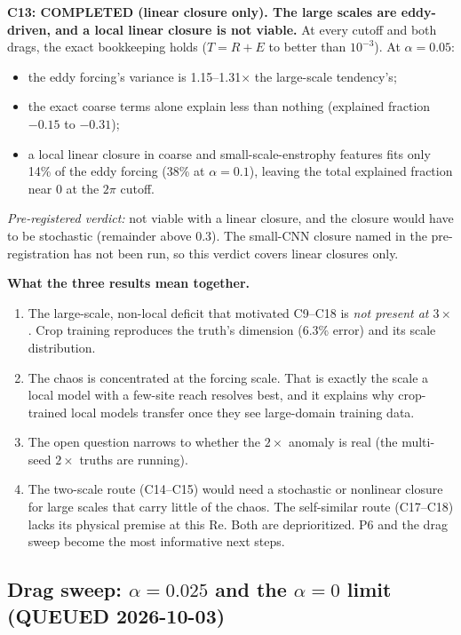 \documentclass[11pt]{article}
\begin{document}
\textbf{C13: COMPLETED (linear closure only). The large scales are
eddy-driven, and a local linear closure is not viable.} At every cutoff
and both drags, the exact bookkeeping holds ($T{=}R{+}E$ to better than
$10^{-3}$). At $\alpha{=}0.05$:
\begin{itemize}[leftmargin=*]
\item the eddy forcing's variance is 1.15--1.31$\times$ the large-scale
  tendency's;
\item the exact coarse terms alone explain less than nothing (explained
  fraction $-0.15$ to $-0.31$);
\item a local linear closure in coarse and small-scale-enstrophy features
  fits only 14\% of the eddy forcing (38\% at $\alpha{=}0.1$), leaving
  the total explained fraction near 0 at the $2\pi$ cutoff.
\end{itemize}
\emph{Pre-registered verdict:} not viable with a linear closure, and the
closure would have to be stochastic (remainder above 0.3). The small-CNN
closure named in the pre-registration has not been run, so this verdict
covers linear closures only.

\textbf{What the three results mean together.}
\begin{enumerate}[leftmargin=*]
\item The large-scale, non-local deficit that motivated C9--C18 is
  \emph{not present at $3\times$}. Crop training reproduces the truth's
  dimension (6.3\% error) and its scale distribution.
\item The chaos is concentrated at the forcing scale. That is exactly
  the scale a local model with a few-site reach resolves best, and it
  explains why crop-trained local models transfer once they see
  large-domain training data.
\item The open question narrows to whether the $2\times$ anomaly is real
  (the multi-seed $2\times$ truths are running).
\item The two-scale route (C14--C15) would need a stochastic or
  nonlinear closure for large scales that carry little of the chaos.
  The self-similar route (C17--C18) lacks its physical premise at this
  Re. Both are deprioritized. P6 and the drag sweep become the most
  informative next steps.
\end{enumerate}

\subsection{Drag sweep: $\alpha{=}0.025$ and the $\alpha{=}0$ limit (QUEUED 2026-10-03)}
\label{sec:drag_sweep}
\end{document}
